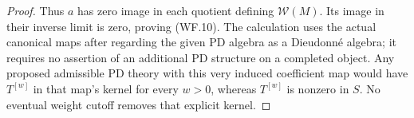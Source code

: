\begin{proof}
Thus $a$ has zero image in each quotient defining
$\mathcal W(M)$. Its image in their inverse
limit is zero, proving (WF.10). The calculation
uses the actual canonical maps after regarding
the given PD algebra as a Dieudonn\'e algebra;
it requires no assertion of an additional PD
structure on a completed object. Any proposed
admissible PD theory with this very induced
coefficient map would have $T^{[w]}$ in that
map's kernel for every $w>0$, whereas $T^{[w]}$
is nonzero in $S$. No eventual weight cutoff
removes that explicit kernel.
\end{proof}
